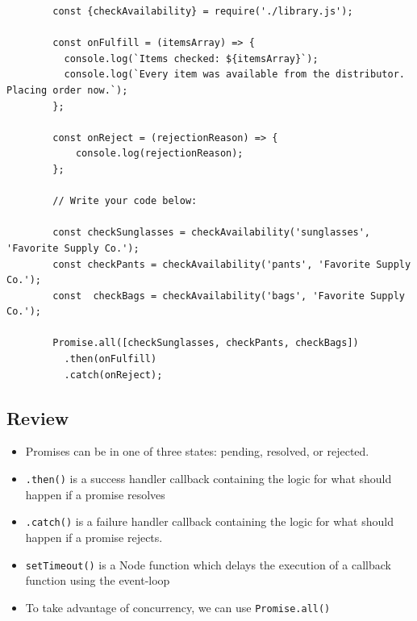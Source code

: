 \documentclass[12pt]{article}
\begin{document}
\begin{itemize}
\begin{itemize}
    \end{itemize}

    \begin{lstlisting}
        const {checkAvailability} = require('./library.js');

        const onFulfill = (itemsArray) => {
          console.log(`Items checked: ${itemsArray}`);
          console.log(`Every item was available from the distributor. Placing order now.`);
        };

        const onReject = (rejectionReason) => {
            console.log(rejectionReason);
        };

        // Write your code below:

        const checkSunglasses = checkAvailability('sunglasses', 'Favorite Supply Co.');
        const checkPants = checkAvailability('pants', 'Favorite Supply Co.');
        const  checkBags = checkAvailability('bags', 'Favorite Supply Co.');

        Promise.all([checkSunglasses, checkPants, checkBags])
          .then(onFulfill)
          .catch(onReject);
    \end{lstlisting}
\end{itemize}

\subsection{Review}
\begin{itemize}
    \item Promises can be in one of three states: pending, resolved, or rejected.
    \item \texttt{.then()} is a success handler callback containing the logic for what should happen if a promise resolves
    \item \texttt{.catch()} is a failure handler callback containing the logic for what should happen if a promise rejects.
    \item \texttt{setTimeout()} is a Node function which delays the execution of a
    callback function using the event-loop
    \item To take advantage of concurrency, we can use \texttt{Promise.all()}
\end{itemize}
\end{document}
